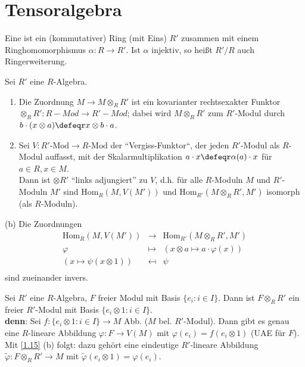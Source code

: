 \section{Tensoralgebra}

\begin{Def}
\label{1.14}
Eine  ist ein (kommutativer) Ring (mit Eins) $R'$
zusammen mit einem Ringhomomorphismus $\alpha: R\to R'$.
Ist $\alpha$ injektiv, so hei\ss t $R'/R$ auch Ringerweiterung.
\end{Def}

\begin{Bem}
\label{1.15}
Sei $R'$ eine $R$-Algebra.
\begin{enumerate}
\item Die Zuordnung $M\to M\otimes_R R'$ ist ein kovarianter rechtsexakter Funktor
$\otimes_R R':R-Mod\to R'-Mod$; dabei wird $M\otimes_R R'$ zum $R'$-Modul durch
$b\cdot (x\otimes a)\defeqr x\otimes b\cdot a$.
\item Sei $V: R'\mbox{-Mod}\to R\mbox{-Mod}$ der ``Vergiss-Funktor``, der jeden $R'$-Modul als 
$R$-Modul auffasst, mit der Skalarmultiplikation $a\cdot x\defeqr\alpha(a)\cdot x$
f\"ur $a\in R, x\in M$.\\
Dann ist $\otimes R'$ ``links adjungiert'' zu $V$, d.h. f\"ur alle 
$R$-Moduln $M$ und $R'$-Moduln $M'$ sind $\textrm{Hom}_R(M, V(M'))$ und 
$\textrm{Hom}_{R'}(M\otimes_R R', M')$ isomorph (als $R$-Moduln).
\end{enumerate}
\end{Bem}

\begin{Bew}
\item[(b)] Die Zuordnungen $$\begin{array}{rcl}
\textrm{Hom}_R(M, V(M')) & \to & \textrm{Hom}_{R'}(M\otimes_R R', M')\\
\varphi & \mapsto & (x\otimes a\mapsto a\cdot \varphi(x))\\
(x\mapsto \psi(x\otimes 1))&\mapsfrom & \psi \\
\end{array}$$
sind zueinander invers.
\end{Bew}

\begin{nnBsp}
Sei $R'$ eine $R$-Algebra, $F$ freier Modul mit Basis $\{e_i:i\in I\}$. Dann ist $F\otimes_R R'$ ein freier
$R'$-Modul mit Basis $\{e_i\otimes 1:i\in I\}$.\\
\textbf{denn}: Sei $f:\{e_i\otimes 1: i\in I\} \to M$ Abb. ($M$ bel. $R'$-Modul).
Dann gibt es genau eine $R$-lineare Abbildung $\varphi: F\to V(M)$ mit $\varphi(e_i)=f(e_i\otimes 1)$ (UAE f\"ur $F$).
Mit \ref{1.15} (b) folgt: dazu geh\"ort eine eindeutige $R'$-lineare Abbildung
$\tilde\varphi: F\otimes_R R'\to M$ mit $\tilde\varphi(e_i\otimes 1)=\varphi(e_i)$.
\end{nnBsp}


